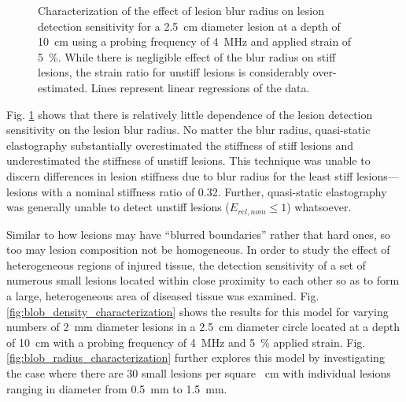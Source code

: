 			\begin{figure}[!htb]
				\centering
				\caption[Quasi-static lesion blur radius characterization]{Characterization of the effect of lesion blur radius on lesion detection sensitivity for a \SI{2.5}{\cm} diameter lesion at a depth of \SI{10}{\cm} using a probing frequency of \SI{4}{\MHz} and applied strain of \SI{5}{\percent}. While there is negligible effect of the blur radius on stiff lesions, the strain ratio for unstiff lesions is considerably over-estimated. Lines represent linear regressions of the data.}
				\label{fig:blur_radius_characterization}
			\end{figure}

			Fig. \ref{fig:blur_radius_characterization} shows that there is relatively little dependence of the lesion detection sensitivity on the lesion blur radius. No matter the blur radius, quasi-static elastography substantially overestimated the stiffness of stiff lesions and underestimated the stiffness of unstiff lesions. This technique was unable to discern differences in lesion stiffness due to blur radius for the least stiff lesions---lesions with a nominal stiffness ratio of 0.32. Further, quasi-static elastography was generally unable to detect unstiff lesions ($E_{rel,nom} \leq 1$) whatsoever.

			Similar to how lesions may have ``blurred boundaries'' rather that hard ones, so too may lesion composition not be homogeneous. In order to study the effect of heterogeneous regions of injured tissue, the detection sensitivity of a set of numerous small lesions located within close proximity to each other so as to form a large, heterogeneous area of diseased tissue was examined. Fig. \ref{fig:blob_density_characterization} shows the results for this model for varying numbers of \SI{2}{\mm} diameter lesions in a \SI{2.5}{\cm} diameter circle located at a depth of \SI{10}{\cm} with a probing frequency of \SI{4}{\MHz} and \SI{5}{\percent} applied strain. Fig. \ref{fig:blob_radius_characterization} further explores this model by investigating the case where there are 30 small lesions per square \SI{}{\cm} with individual lesions ranging in diameter from \SI{0.5}{\mm} to \SI{1.5}{\mm}.


